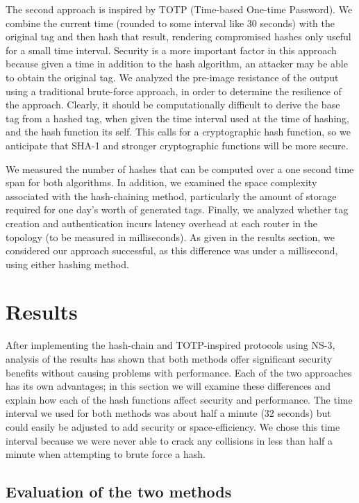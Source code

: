 \documentclass[12pt]{article} %
\begin{document}
The second approach is inspired by TOTP (Time-based One-time Password)\cite{rfc6238}. We combine the current time (rounded to some interval like 30 seconds) with the original tag and then hash that result, rendering compromised hashes only useful for a small time interval. Security is a more important factor in this approach because given a time in addition to the hash algorithm, an attacker may be able to obtain the original tag. We analyzed the pre-image resistance of the output using a traditional brute-force approach, in order to determine the resilience of the approach. Clearly, it should be computationally difficult to derive the base tag from a hashed tag, when given the time interval used at the time of hashing, and the hash function its self. This calls for a cryptographic hash function, so we anticipate that SHA-1 and stronger cryptographic functions will be more secure. 

We measured the number of hashes that can be computed over a one second time span for both algorithms. In addition, we examined the space complexity associated with the hash-chaining method, particularly the amount of storage required for one day's worth of generated tags. Finally, we analyzed whether tag creation and authentication incurs latency overhead at each router in the topology (to be measured in milliseconds). As given in the results section, we considered our approach successful, as this difference was under a millisecond, using either hashing method.

\section{Results}

After implementing the hash-chain and TOTP-inspired protocols using NS-3, analysis of the results has shown that both methods offer significant security benefits without causing problems with performance. Each of the two approaches has its own advantages; in this section we will examine these differences and explain how each of the hash functions affect security and performance. The time interval we used for both methods was about half a minute (32 seconds) but could easily be adjusted to add security or space-efficiency. We chose this time interval because we were never able to crack any collisions in less than half a minute when attempting to brute force a hash. 

\subsection{Evaluation of the two methods}
\end{document}
